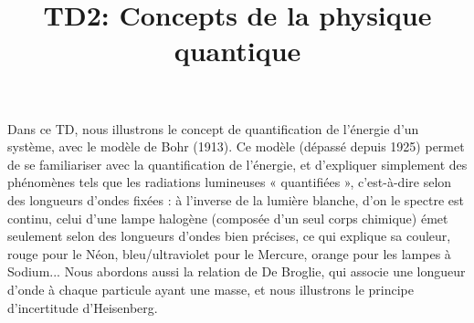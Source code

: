 \documentclass{article}
\author{}
\date{}
\title{TD2: Concepts de la physique quantique}
\begin{document}
\maketitle
Dans ce TD, nous illustrons le concept de quantification de l'énergie d'un système, avec le modèle de Bohr (1913). Ce modèle (dépassé depuis 1925) permet de se familiariser avec la quantification de l'énergie, et d'expliquer simplement des phénomènes tels que les radiations lumineuses « quantifiées », c'est-à-dire selon des longueurs d'ondes fixées : à l'inverse de la lumière blanche, d'on le spectre est continu, celui d'une lampe halogène (composée d'un seul corps chimique) émet seulement selon des longueurs d'ondes bien précises, ce qui explique sa couleur, rouge pour le Néon, bleu/ultraviolet pour le Mercure, orange pour les lampes à Sodium...\newline\newline
\indent Nous abordons aussi la relation de De Broglie, qui associe une longueur d'onde à chaque particule ayant une masse, et nous illustrons le principe d'incertitude d'Heisenberg.\newline\newline
\end{document}
